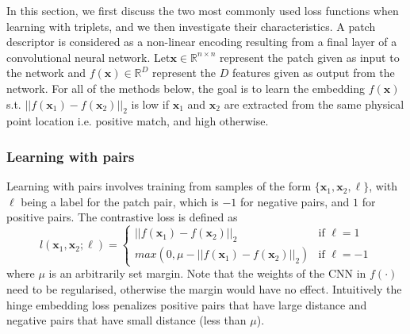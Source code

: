 In this section, we first discuss the two most commonly used loss functions when learning with triplets, and we then investigate their characteristics.  A patch descriptor is considered as  a non-linear encoding resulting from a final layer of a convolutional neural network. Let$\boldsymbol x \in \mathbb{R}^{n \times n}$ represent the patch given
as input to the network and $f(\boldsymbol x) \in \mathbb{R}^{D}$
represent the $D$ features given as output from the network.
For all of the methods below, the goal is to learn the embedding
$f(\boldsymbol x)$ s.t. $||f(\boldsymbol x_1) - f(\boldsymbol x_2)
||_2$ is low if $\boldsymbol x_1$ and $\boldsymbol x_2$ are extracted from the same physical point location i.e. positive match, and high otherwise.

\subsubsection{Learning with pairs}
Learning with pairs involves training from samples of the form
$\{\boldsymbol x_1,\boldsymbol x_2,\ell\}$, with  $\ell$ being 
 a label for the patch pair, which is $-1$
for negative pairs, and $1$ for positive pairs. The contrastive loss is defined as 
\begin{equation}
  \label{eq:contrastive-loss}
  l(\boldsymbol x_1,\boldsymbol x_2;\ell) =
\left\{
	\begin{array}{ll}
		||f(\boldsymbol x_1)-f(\boldsymbol x_2)||_2  & \mbox{if } \ell=1 \\
		max(0,\mu-||f(\boldsymbol x_1)-f(\boldsymbol x_2)||_2)  & \mbox{if } \ell=-1
	\end{array}
\right.
\end{equation}
where $\mu$ is an arbitrarily set margin. Note that the
weights of the CNN in $f(\cdot)$ need to be regularised, otherwise the margin would
have no effect. Intuitively the hinge embedding loss penalizes positive pairs
that have large distance and negative
pairs that have small distance (less than $\mu$).

